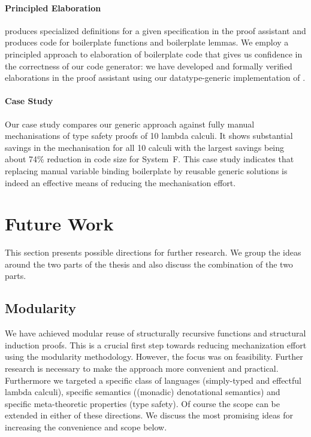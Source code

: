 \paragraph{Principled Elaboration}
\Needle produces specialized definitions for a given \Knot specification in the
\Coq proof assistant and produces code for boilerplate functions and boilerplate
lemmas. We employ a principled approach to elaboration of boilerplate code that
gives us confidence in the correctness of our code generator: we have developed
and formally verified elaborations in the \Coq proof assistant using our
datatype-generic implementation \Loom of \Knot.

\paragraph{Case Study}
Our case study compares our generic approach against fully manual mechanisations
of type safety proofs of 10 lambda calculi. It shows substantial savings in the
mechanisation for all 10 calculi with the largest savings being about 74\%
reduction in code size for System~F. This case study indicates that replacing
manual variable binding boilerplate by reusable generic solutions is indeed an
effective means of reducing the mechanisation effort.


\section{Future Work}

This section presents possible directions for further research. We group the
ideas around the two parts of the thesis and also discuss the combination of the
two parts.

\subsection{Modularity}

We have achieved modular reuse of structurally recursive functions and
structural induction proofs. This is a crucial first step towards reducing
mechanization effort using the modularity methodology. However, the focus was on
feasibility. Further research is necessary to make the approach more convenient
and practical. Furthermore we targeted a specific class of languages
(simply-typed and effectful lambda calculi), specific semantics ((monadic)
denotational semantics) and specific meta-theoretic properties (type safety). Of
course the scope can be extended in either of these directions. We discuss the
most promising ideas for increasing the convenience and scope below.

